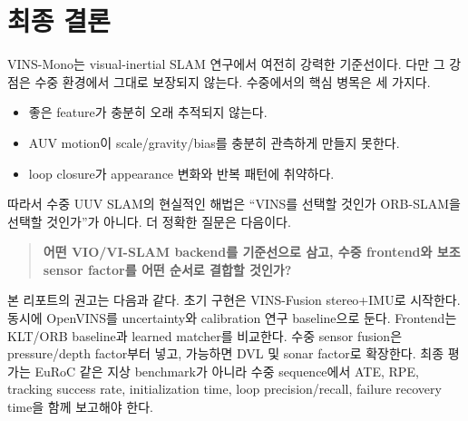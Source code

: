 \documentclass[11pt,a4paper]{article}
\begin{document}
\section{최종 결론}

VINS-Mono는 visual-inertial SLAM 연구에서 여전히 강력한 기준선이다.
다만 그 강점은 수중 환경에서 그대로 보장되지 않는다.
수중에서의 핵심 병목은 세 가지다.

\begin{itemize}
  \item 좋은 feature가 충분히 오래 추적되지 않는다.
  \item AUV motion이 scale/gravity/bias를 충분히 관측하게 만들지 못한다.
  \item loop closure가 appearance 변화와 반복 패턴에 취약하다.
\end{itemize}

따라서 수중 UUV SLAM의 현실적인 해법은 ``VINS를 선택할 것인가 ORB-SLAM을 선택할 것인가''가 아니다.
더 정확한 질문은 다음이다.

\begin{quote}
\textbf{어떤 VIO/VI-SLAM backend를 기준선으로 삼고, 수중 frontend와 보조 sensor factor를 어떤 순서로 결합할 것인가?}
\end{quote}

본 리포트의 권고는 다음과 같다.
초기 구현은 VINS-Fusion stereo+IMU로 시작한다.
동시에 OpenVINS를 uncertainty와 calibration 연구 baseline으로 둔다.
Frontend는 KLT/ORB baseline과 learned matcher를 비교한다.
수중 sensor fusion은 pressure/depth factor부터 넣고, 가능하면 DVL 및 sonar factor로 확장한다.
최종 평가는 EuRoC 같은 지상 benchmark가 아니라 수중 sequence에서 ATE, RPE, tracking success rate, initialization time, loop precision/recall, failure recovery time을 함께 보고해야 한다.
\end{document}
